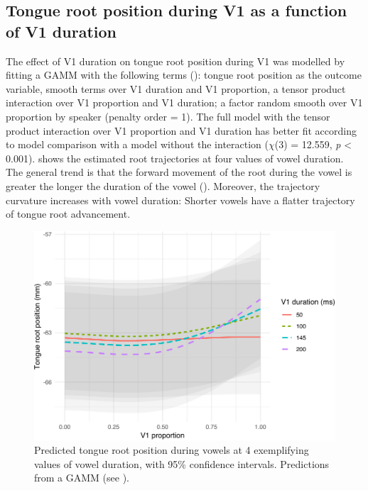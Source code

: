 \documentclass[
  12pt,
]{article}
\begin{document}
\hypertarget{tongue-root-position-during-v1-as-a-function-of-v1-duration}{%
\subsection{Tongue root position during V1 as a function of V1
duration}\label{tongue-root-position-during-v1-as-a-function-of-v1-duration}}

\label{s:trp-v1-dur}

The effect of V1 duration on tongue root position during V1 was modelled
by fitting a GAMM with the following terms
(): tongue root position as the outcome
variable, smooth terms over V1 duration and V1 proportion, a tensor
product interaction over V1 proportion and V1 duration; a factor random
smooth over V1 proportion by speaker (penalty order = 1). The full model
with the tensor product interaction over V1 proportion and V1 duration
has better fit according to model comparison with a model without the
interaction (\(\chi\)(3) = 12.559, \emph{p} \textless{} 0.001).
 shows the estimated root trajectories at four
values of vowel duration. The general trend is that the forward movement
of the root during the vowel is greater the longer the duration of the
vowel (). Moreover, the trajectory curvature
increases with vowel duration: Shorter vowels have a flatter trajectory
of tongue root advancement.

\begin{figure}
\includegraphics[width=\linewidth]{2018-tra_files/figure-latex/tra-gam-2-plot-1} \caption{Predicted tongue root position during vowels at 4 exemplifying values of vowel duration, with 95\% confidence intervals. Predictions from a GAMM (see ).}\label{f:tra-gam-2-plot}
\end{figure}
\end{document}
